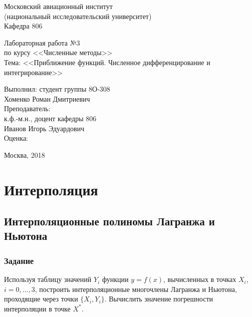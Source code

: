 \documentclass[a4paper,12pt]{article}
\begin{document}
\begin{titlepage}
\begin{center}
    {Московский авиационный институт} \\
    {(национальный исследовательский университет)} \\
    {Кафедра 806}

\vspace{8cm}
\large{
    {Лабораторная работа №3} \\
    {по курсу <<Численные методы>>} \\
    {Тема: <<Приближение функций. Численное дифференцирование и интегрирование>>}
}
\end{center}

\vspace{6cm}
\begin{flushright}
\begin{minipage}{0.4\textwidth}
    \begin{flushleft}
        {Выполнил: студент группы 8О-308} \\
        {Хоменко Роман Дмитриевич} \\
        \vspace{0.5cm}
        {Преподаватель:} \\
        {к.ф.-м.н., доцент кафедры 806} \\
        {Иванов Игорь Эдуардович} \\
        \vspace{0.5cm}
        Оценка:
    \end{flushleft}
\end{minipage}
\end{flushright}

\vfill
\begin{center}
    {Москва, 2018}
\end{center}

\end{titlepage}

\section{Интерполяция}
\subsection{Интерполяционные полиномы Лагранжа и Ньютона}
\subsubsection{Задание}
Используя таблицу значений $Y_i$ функции $y = f(x)$, вычисленных в точках
$X_i$, $i = 0, \ldots, 3$, построить интерполяционные многочлены Лагранжа
и Ньютона, проходящие через точки $\{X_i, Y_i\}$. Вычислить значение
погрешности интерполяции в точке $X^{*}$.
\end{document}
